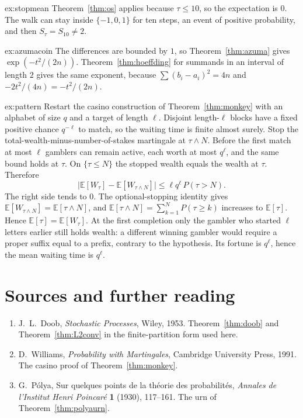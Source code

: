 \begin{solution}{ex:stopmean}
\writeup Theorem~\ref{thm:os} applies because $\tau\le 10$, so the expectation is $0$. The walk can stay inside $\{-1,0,1\}$ for ten steps, an event of positive probability, and then $S_\tau=S_{10}\ne2$.
\end{solution}

\begin{solution}{ex:azumacoin}
\writeup The differences are bounded by $1$, so Theorem~\ref{thm:azuma} gives $\exp(-t^2/(2n))$. Theorem~\ref{thm:hoeffding} for summands in an interval of length $2$ gives the same exponent, because $\sum(b_i-a_i)^2=4n$ and $-2t^2/(4n)=-t^2/(2n)$.
\end{solution}

\begin{solution}{ex:pattern}
\writeup Restart the casino construction of Theorem~\ref{thm:monkey} with an alphabet of size $q$ and a target of length $\ell$. Disjoint length-$\ell$ blocks have a fixed positive chance $q^{-\ell}$ to match, so the waiting time is finite almost surely. Stop the total-wealth-minus-number-of-stakes martingale at $\tau\wedge N$. Before the first match at most $\ell$ gamblers can remain active, each worth at most $q^\ell$, and the same bound holds at $\tau$. On $\{\tau\le N\}$ the stopped wealth equals the wealth at $\tau$. Therefore
\[
 \bigl|\mathbb E[W_\tau]-\mathbb E[W_{\tau\wedge N}]\bigr|\le \ell q^\ell\,P(\tau>N).
\]
The right side tends to $0$. The optional-stopping identity gives $\mathbb E[W_{\tau\wedge N}]=\mathbb E[\tau\wedge N]$, and $\mathbb E[\tau\wedge N]=\sum_{k=1}^N P(\tau\ge k)$ increases to $\mathbb E[\tau]$. Hence $\mathbb E[\tau]=\mathbb E[W_\tau]$. At the first completion only the gambler who started $\ell$ letters earlier still holds wealth: a different winning gambler would require a proper suffix equal to a prefix, contrary to the hypothesis. Its fortune is $q^\ell$, hence the mean waiting time is $q^\ell$.
\end{solution}

\section*{Sources and further reading}

\begin{enumerate}
\item J.~L.~Doob, \emph{Stochastic Processes}, Wiley, 1953. Theorem~\ref{thm:doob} and Theorem~\ref{thm:L2conv} in the finite-partition form used here.
\item D.~Williams, \emph{Probability with Martingales}, Cambridge University Press, 1991. The casino proof of Theorem~\ref{thm:monkey}.
\item G.~P\'olya, Sur quelques points de la th\'eorie des probabilit\'es, \emph{Annales de l'Institut Henri Poincar\'e} \textbf{1} (1930), 117--161. The urn of Theorem~\ref{thm:polyaurn}.
\end{enumerate}
